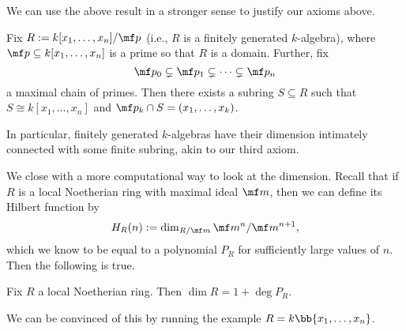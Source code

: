 We can use the above result in a stronger sense to justify our axioms above.
\begin{theorem}
	Fix $R:=k[x_1,\ldots,x_n]/\mf p$ (i.e., $R$ is a finitely generated $k$-algebra), where $\mf p\subseteq k[x_1,\ldots,x_n]$ is a prime so that $R$ is a domain. Further, fix
	\[\mf p_0\subsetneq\mf p_1\subsetneq\cdots\subsetneq\mf p_n\]
	a maximal chain of primes. Then there exists a subring $S\subseteq R$ such that $S\cong k[x_1,\ldots,x_n]$ and $\mf p_k\cap S=(x_1,\ldots,x_k)$.  
\end{theorem}
In particular, finitely generated $k$-algebras have their dimension intimately connected with some finite subring, akin to our third axiom.

We close with a more computational way to look at the dimension. Recall that if $R$ is a local Noetherian ring with maximal ideal $\mf m$, then we can define its Hilbert function by
\[H_R(n):=\dim_{R/\mf m}\mf m^n/\mf m^{n+1},\]
which we know to be equal to a polynomial $P_R$ for sufficiently large values of $n$. Then the following is true.
\begin{theorem}
	Fix $R$ a local Noetherian ring. Then $\dim R=1+\deg P_R$.
\end{theorem}
We can be convinced of this by running the example $R=k\bb{x_1,\ldots,x_n}$.